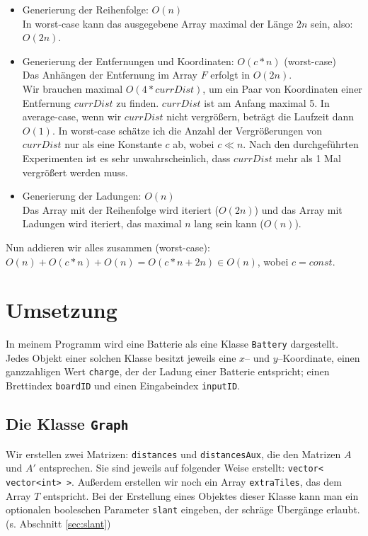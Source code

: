 \documentclass[a4paper,10pt,ngerman]{scrartcl}
\begin{document}
\begin{itemize}
  \item Generierung der Reihenfolge: $O(n)$\\
  In worst-case kann das ausgegebene Array maximal der Länge $2n$ sein, also: $O(2n)$.
  \item Generierung der Entfernungen und Koordinaten: $O(c*n)$ (worst-case)\\
  Das Anhängen der Entfernung im Array $F$ erfolgt in $O(2n)$.\\
  Wir brauchen maximal $O(4*currDist)$, um ein Paar von Koordinaten einer Entfernung $currDist$
  zu finden. $currDist$ ist am Anfang maximal 5. In average-case, wenn wir $currDist$ nicht vergrößern,
  beträgt die Laufzeit dann $O(1)$. In worst-case schätze ich die Anzahl der Vergrößerungen von $currDist$
  nur als eine Konstante $c$ ab, wobei $c \ll n$. Nach den durchgeführten Experimenten ist es sehr unwahrscheinlich,
  dass $currDist$ mehr als 1 Mal vergrößert werden muss.
  \item Generierung der Ladungen: $O(n)$\\
  Das Array mit der Reihenfolge wird iteriert ($O(2n)$) und das Array mit Ladungen wird iteriert,
  das maximal $n$ lang sein kann ($O(n)$).
\end{itemize}

Nun addieren wir alles zusammen (worst-case):\\
$O(n) + O(c*n) + O(n) = O(c*n + 2n) \in O(n)$, wobei $c = const.$\\


\newpage
\section{Umsetzung}
In meinem Programm wird eine Batterie als eine Klasse \texttt{Battery} dargestellt.
Jedes Objekt einer solchen Klasse besitzt jeweils eine $x$-- und $y$--Koordinate,
einen ganzzahligen Wert \texttt{charge}, der der Ladung einer Batterie entspricht;
einen Brettindex \texttt{boardID} und einen Eingabeindex \texttt{inputID}.

\subsection{Die Klasse \texttt{Graph}}
Wir erstellen zwei Matrizen: \texttt{distances} und \texttt{distancesAux}, die den Matrizen 
$A$ und $A'$ entsprechen. Sie sind jeweils auf folgender Weise erstellt: \texttt{vector< vector<int> >}.
Außerdem erstellen wir noch ein Array \texttt{extraTiles}, das dem Array $T$ entspricht.
Bei der Erstellung eines Objektes dieser Klasse kann man ein optionalen booleschen Parameter \texttt{slant}
eingeben, der schräge Übergänge erlaubt. (s. Abschnitt \ref{sec:slant}) \\
\end{document}
